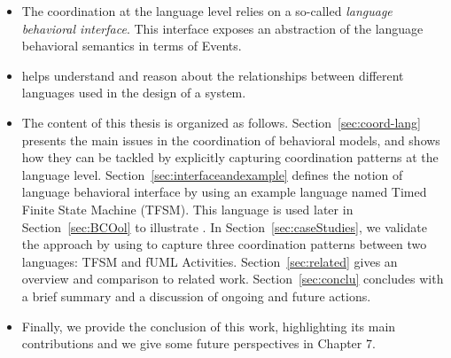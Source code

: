 \begin{itemize}
	 \item The coordination at the language level relies on a so-called \emph{language behavioral interface}. This interface exposes an abstraction of the language behavioral semantics in terms of Events. 
	 
	 \item \bcool helps understand and reason about the relationships between different languages used in the design of a system. 
	
	
	
	\item The content of this thesis is organized as follows. Section~\ref{sec:coord-lang} presents the main issues in the coordination of behavioral models, and shows how they can be tackled by explicitly capturing coordination patterns at the language level. Section~\ref{sec:interfaceandexample} defines the notion of language behavioral interface by using an example language named Timed Finite State Machine (TFSM). This language is used later in Section~\ref{sec:BCOol} to illustrate \bcool. In Section~\ref{sec:caseStudies}, we validate the approach by using \bcool to capture three coordination patterns between two languages: TFSM and fUML Activities. Section~\ref{sec:related} gives an overview and comparison to related work. Section~\ref{sec:conclu} concludes with a brief summary and a discussion of ongoing and future actions.
	
	\item Finally, we provide the conclusion of this work, highlighting its main contributions and
	we give some future perspectives in Chapter 7.
	
\end{itemize}








